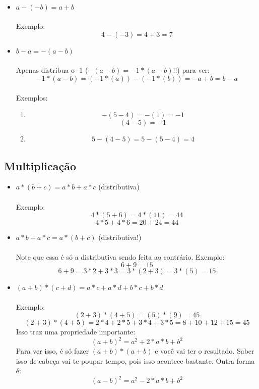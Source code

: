 \documentclass{article}
\begin{document}
\paragraph{}
\begin{itemize}
	\item $a - (-b) = a + b$
	\paragraph{}
	Exemplo:
	$$4 - (-3) = 4 + 3 = 7$$
	\item $b - a = -(a - b)$
	\paragraph{}
	Apenas distribua o -1 ($-(a - b) = -1*(a - b)$!!) para ver:
	$$-1*(a - b) = (-1*(a)) - (-1*(b)) = -a + b = b - a$$
	\paragraph{}
	Exemplos:
	\begin{enumerate}
		\item 
		$$-(5 - 4) = -(1) = -1$$
		$$(4 - 5) = -1$$
		\item 
		$$5 - (4 - 5) = 5 - (5 - 4) = 4$$
	\end{enumerate}
\end{itemize}

\subsection{Multiplicação}
\begin{itemize}
	\item $a*(b+c) = a*b + a*c$ (distributiva)
	\paragraph{}
	Exemplo:
	$$4*(5 + 6) = 4*(11) = 44$$
	$$4*5 + 4*6 = 20 + 24 = 44$$
	\item $a*b + a*c = a*(b + c)$ (distributiva!)
	\paragraph{}
	Note que essa é só a distributiva sendo feita ao contrário. Exemplo:
	$$6 + 9 = 15$$
	$$6 + 9 = 3*2 + 3*3 = 3*(2 + 3) = 3*(5) = 15$$
	\item $(a + b)*(c + d) = a*c + a*d + b*c + b*d$
	\paragraph{}
	Exemplo:
	$$(2+3)*(4+5) = (5)*(9) = 45$$
	$$(2+3)*(4+5) = 2*4 + 2*5 + 3*4 + 3*5 = 8 + 10 + 12 + 15 = 45$$
	Isso traz uma propriedade importante:
	$${(a+b)}^2 = a^2 + 2*a*b + b^2$$
	Para ver isso, é só fazer $(a+b)*(a+b)$ e você vai ter o resultado. Saber 
	isso de cabeça vai te poupar tempo, pois isso acontece bastante. Outra 
	forma é:
	$${(a-b)}^2 = a^2 - 2*a*b + b^2$$
\end{itemize}
\end{document}

